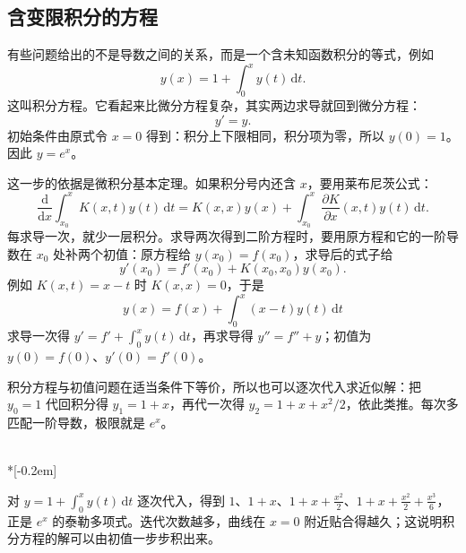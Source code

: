 \subsection{含变限积分的方程}

有些问题给出的不是导数之间的关系，而是一个含未知函数积分的等式，例如
\[
  y(x)=1+\int_0^x y(t)\,\mathrm{d}t.
\]
这叫积分方程。它看起来比微分方程复杂，其实两边求导就回到微分方程：
\[
  y'=y.
\]
初始条件由原式令 $x=0$ 得到：积分上下限相同，积分项为零，所以 $y(0)=1$。因此 $y=e^x$。

这一步的依据是微积分基本定理。如果积分号内还含 $x$，要用莱布尼茨公式：
\[
  \frac{\mathrm{d}}{\mathrm{d}x}\int_{x_0}^x K(x,t)y(t)\,\mathrm{d}t
  =K(x,x)y(x)+\int_{x_0}^x \frac{\partial K}{\partial x}(x,t)y(t)\,\mathrm{d}t.
\]
每求导一次，就少一层积分。求导两次得到二阶方程时，要用原方程和它的一阶导数在 $x_0$ 处补两个初值：原方程给 $y(x_0)=f(x_0)$，求导后的式子给
\[
  y'(x_0)=f'(x_0)+K(x_0,x_0)y(x_0).
\]
例如 $K(x,t)=x-t$ 时 $K(x,x)=0$，于是
\[
  y(x)=f(x)+\int_0^x (x-t)y(t)\,\mathrm{d}t
\]
求导一次得 $y'=f'+\int_0^x y(t)\,\mathrm{d}t$，再求导得 $y''=f''+y$；初值为 $y(0)=f(0)$、$y'(0)=f'(0)$。

积分方程与初值问题在适当条件下等价，所以也可以逐次代入求近似解：把 $y_0=1$ 代回积分得 $y_1=1+x$，再代一次得 $y_2=1+x+x^2/2$，依此类推。每次多匹配一阶导数，极限就是 $e^x$。

\begin{center}
\\*[-0.2em]
\parbox{0.86\linewidth}{\centering\footnotesize
对 $y=1+\int_0^x y(t)\,\mathrm{d}t$ 逐次代入，得到 $1$、$1+x$、$1+x+\frac{x^2}{2}$、$1+x+\frac{x^2}{2}+\frac{x^3}{6}$，正是 $e^x$ 的泰勒多项式。迭代次数越多，曲线在 $x=0$ 附近贴合得越久；这说明积分方程的解可以由初值一步步积出来。}
\end{center}

